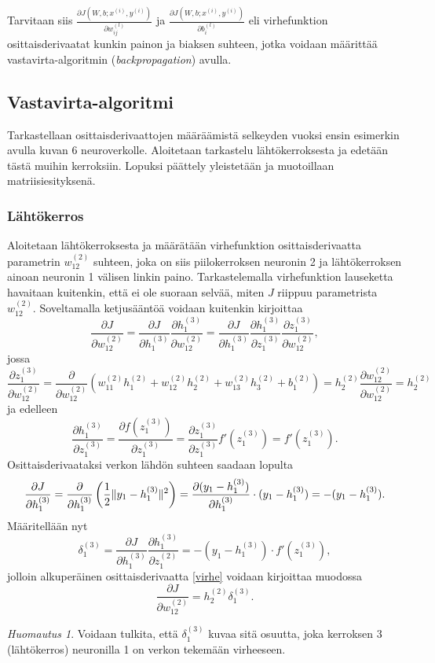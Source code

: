 \documentclass[12pt,a4paper,finnish,oneside,titlepage]{article}
\DeclarePairedDelimiter\norm{\lVert}{\rVert}%
\theoremstyle{plain}
\theoremstyle{definition}
\theoremstyle{remark}
\newtheorem{huom}[lause]{Huomautus}    %
\begin{document}
Tarvitaan siis \(\displaystyle \frac{\partial J(W, b; x^{(i)}, y^{(i)})}{\partial w_{ij}^{(l)}}\) ja \(\displaystyle \frac{\partial J(W, b; x^{(i)}, y^{(i)})}{\partial b_{i}^{(l)}}\) eli virhefunktion osittaisderivaatat kunkin painon ja biaksen suhteen, jotka voidaan määrittää vastavirta-algoritmin (\textit{backpropagation}) avulla.

\subsection{Vastavirta-algoritmi}
Tarkastellaan osittaisderivaattojen määräämistä selkeyden vuoksi ensin esimerkin avulla kuvan 6 neuroverkolle. Aloitetaan tarkastelu lähtökerroksesta ja edetään tästä muihin kerroksiin. Lopuksi päättely yleistetään ja muotoillaan matriisiesityksenä.

\subsubsection{Lähtökerros}
Aloitetaan lähtökerroksesta ja määrätään virhefunktion osittaisderivaatta parametrin \(w_{12}^{(2)}\) suhteen, joka on siis piilokerroksen neuronin 2 ja lähtökerroksen ainoan neuronin 1 välisen linkin paino. Tarkastelemalla virhefunktion lauseketta havaitaan kuitenkin, että ei ole suoraan selvää, miten \(J\) riippuu parametrista \(w_{12}^{(2)}\). Soveltamalla ketjusääntöä voidaan kuitenkin kirjoittaa \begin{equation} \label{virhe} \frac{\partial J}{\partial w_{12}^{(2)}}=\frac{\partial J}{\partial h_1^{(3)}} \frac{\partial h_1^{(3)}}{\partial w_{12}^{(2)}}=\frac{\partial J}{\partial h_1^{(3)}} \frac{\partial h_1^{(3)}}{\partial z_1^{(3)}} \frac{\partial z_1^{(3)}}{\partial w_{12}^{(2)}},\end{equation} jossa \[\frac{\partial z_1^{(3)}}{\partial w_{12}^{(2)}}=\frac{\partial}{\partial w_{12}^{(2)}}(w_{11}^{(2)} h_1^{(2)}+w_{12}^{(2)} h_2^{(2)}+w_{13}^{(2)} h_3^{(2)}+b_1^{(2)})=h_2^{(2)}\frac{\partial w_{12}^{(2)}}{\partial w_{12}^{(2)}}=h_2^{(2)}\] ja edelleen \[\frac{\partial h_1^{(3)}}{\partial z_1^{(3)}}=\frac{\partial f(z_1^{(3)})}{\partial z_1^{(3)}}=\frac{\partial z_1^{(3)}}{\partial z_1^{(3)}} f'(z_1^{(3)})=f'(z_1^{(3)}).\]
Osittaisderivaataksi verkon lähdön suhteen saadaan lopulta \[\frac{\partial J}{\partial h_1^{(3)}}=\frac{\partial}{\partial h_1^{(3)}} \left(\frac{1}{2}\norm{y_1-h_1^{(3)}}^2\right)=\frac{\partial (y_1-h_1^{(3)})}{\partial h_1^{(3)}}\cdot (y_1-h_1^{(3)})=-(y_1-h_1^{(3)}).\] Määritellään nyt \[\delta_1^{(3)}=\frac{\partial J}{\partial h_1^{(3)}}\frac{\partial h_1^{(3)}}{\partial z_1^{(2)}}=-(y_1-h_1^{(3)})\cdot f'(z_1^{(3)}),\] jolloin alkuperäinen osittaisderivaatta \ref{virhe} voidaan kirjoittaa muodossa \[\frac{\partial J}{\partial w_{12}^{(2)}}=h_2^{(2)} \delta_1^{(3)}.\]
\begin{huom}
Voidaan tulkita, että \(\delta_1^{(3)}\) kuvaa sitä osuutta, joka kerroksen 3 (lähtökerros) neuronilla 1 on verkon tekemään virheeseen.
\end{huom}
\end{document}
